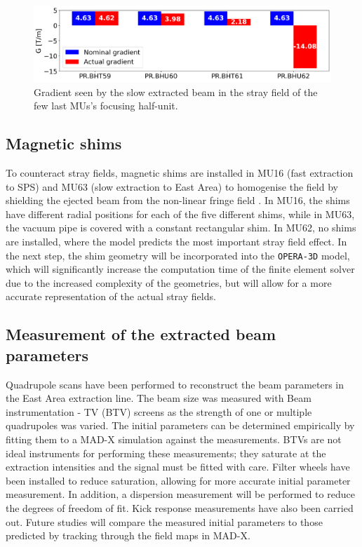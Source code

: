 \documentclass[a4paper,
               biblatex,     %
               keeplastbox,   %
               ]{jacow}
\begin{document}
\begin{figure}[!htb]
   \centering
   \includegraphics*[width=1.0\columnwidth]{gradient_focusing_poster.png}
   \caption{Gradient seen by the slow extracted beam in the stray field of the few last MUs's focusing half-unit.}
   \label{fig:stray field gradients}
\end{figure}

\subsection{Magnetic shims}

To counteract stray fields, magnetic shims are installed in MU16 (fast extraction to SPS) and MU63 (slow extraction to East Area) to homogenise the field by shielding the ejected beam from the non-linear fringe field \cite{zickler_influence_nodate}. In MU16, the shims have different radial positions for each of the five different shims, while in MU63, the vacuum pipe is covered with a constant rectangular shim. In MU62, no shims are installed, where the model predicts the most important stray field effect. In the next step, the shim geometry will be incorporated into the \texttt{OPERA-3D} model, which will significantly increase the computation time of the finite element solver due to the increased complexity of the geometries, but will allow for a more accurate representation of the actual stray fields.

\subsection{Measurement of the extracted beam parameters}

Quadrupole scans have been performed to reconstruct the beam parameters in the East Area extraction line. The beam size was measured with Beam instrumentation - TV (BTV) screens as the strength of one or multiple quadrupoles was varied. The initial parameters can be determined empirically by fitting them to a MAD-X simulation against the measurements. BTVs are not ideal instruments for performing these measurements; they saturate at the extraction intensities and the signal must be fitted with care. Filter wheels have been installed to reduce saturation, allowing for more accurate initial parameter measurement. In addition, a dispersion measurement will be performed to reduce the degrees of freedom of fit.
Kick response measurements have also been carried out. Future studies will compare the measured initial parameters to those predicted by tracking through the field maps in MAD-X.
\end{document}
